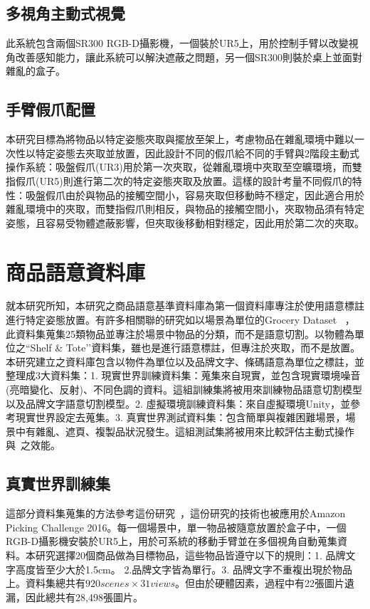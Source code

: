 \subsection{多視角主動式視覺}
此系統包含兩個SR300 RGB-D攝影機，一個裝於UR5上，用於控制手臂以改變視角改善感知能力，讓此系統可以解決遮蔽之問題，另一個SR300則裝於桌上並面對雜亂的盒子。

\subsection{手臂假爪配置}
本研究目標為將物品以特定姿態夾取與擺放至架上，考慮物品在雜亂環境中難以一次性以特定姿態去夾取並放置，因此設計不同的假爪給不同的手臂與2階段主動式操作系統：吸盤假爪(UR3)用於第一次夾取，從雜亂環境中夾取至空曠環境，而雙指假爪(UR5)則進行第二次的特定姿態夾取及放置。這樣的設計考量不同假爪的特性：吸盤假爪由於與物品的接觸空間小，容易夾取但移動時不穩定，因此適合用於雜亂環境中的夾取，而雙指假爪則相反，與物品的接觸空間小，夾取物品須有特定姿態，且容易受物體遮蔽影響，但夾取後移動相對穩定，因此用於第二次的夾取。


\section{商品語意資料庫}
就本研究所知，本研究之商品語意基準資料庫為第一個資料庫專注於使用語意標註進行特定姿態放置。有許多相關聯的研究如以場景為單位的Grocery Dataset ~\cite{}，此資料集蒐集25類物品並專注於場景中物品的分類，而不是語意切割。以物體為單位之``Shelf & Tote’’資料集，雖也是進行語意標註，但專注於夾取，而不是放置。本研究建立之資料庫包含以物件為單位以及品牌文字、條碼語意為單位之標註，並整理成3大資料集：1. 現實世界訓練資料集：蒐集來自現實，並包含現實環境噪音(亮暗變化、反射)、不同色調的資料。這組訓練集將被用來訓練物品語意切割模型以及品牌文字語意切割模型。2. 虛擬環境訓練資料集：來自虛擬環境Unity，並參考現實世界設定去蒐集。3. 真實世界測試資料集：包含簡單與複雜困難場景，場景中有雜亂、遮頁、複製品狀況發生。這組測試集將被用來比較評估主動式操作與~\cite{peterthesis}之效能。

\subsection{真實世界訓練集}
這部分資料集蒐集的方法參考這份研究~\cite{}，這份研究的技術也被應用於Amazon Picking Challenge 2016。每一個場景中，單一物品被隨意放置於盒子中，一個RGB-D攝影機安裝於UR5上，用於可系統的移動手臂並在多個視角自動蒐集資料。本研究選擇20個商品做為目標物品，這些物品皆遵守以下的規則：1. 品牌文字高度皆至少大於1.5cm。 2.品牌文字皆為單行。3. 品牌文字不重複出現於物品上。資料集總共有$920 scenes\times 31 views$。但由於硬體因素，過程中有22張圖片遺漏，因此總共有28,498張圖片。

